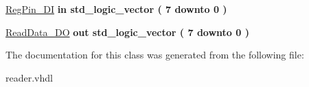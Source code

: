 \begin{DoxyCompactItemize}
\item 
\mbox{\label{classreader_a843b93038e74da7136511dc8e358d422}} 
\hyperlink{classreader_a843b93038e74da7136511dc8e358d422}{Reg\+Pin\+\_\+\+DI}  {\bfseries {\bfseries \textcolor{vhdlchar}{in}\textcolor{vhdlchar}{ }}} {\bfseries \textcolor{vhdlchar}{std\+\_\+logic\+\_\+vector}\textcolor{vhdlchar}{ }\textcolor{vhdlchar}{(}\textcolor{vhdlchar}{ }\textcolor{vhdlchar}{ } \textcolor{vhdldigit}{7} \textcolor{vhdlchar}{ }\textcolor{vhdlchar}{downto}\textcolor{vhdlchar}{ }\textcolor{vhdlchar}{ } \textcolor{vhdldigit}{0} \textcolor{vhdlchar}{ }\textcolor{vhdlchar}{)}\textcolor{vhdlchar}{ }} 
\item 
\mbox{\label{classreader_a5d1786ca402f4cb13a201fef92d03143}} 
\hyperlink{classreader_a5d1786ca402f4cb13a201fef92d03143}{Read\+Data\+\_\+\+DO}  {\bfseries {\bfseries \textcolor{vhdlchar}{out}\textcolor{vhdlchar}{ }}} {\bfseries \textcolor{vhdlchar}{std\+\_\+logic\+\_\+vector}\textcolor{vhdlchar}{ }\textcolor{vhdlchar}{(}\textcolor{vhdlchar}{ }\textcolor{vhdlchar}{ } \textcolor{vhdldigit}{7} \textcolor{vhdlchar}{ }\textcolor{vhdlchar}{downto}\textcolor{vhdlchar}{ }\textcolor{vhdlchar}{ } \textcolor{vhdldigit}{0} \textcolor{vhdlchar}{ }\textcolor{vhdlchar}{)}\textcolor{vhdlchar}{ }} 
\end{DoxyCompactItemize}


The documentation for this class was generated from the following file\+:\begin{DoxyCompactItemize}
\item 
reader.\+vhdl\end{DoxyCompactItemize}
